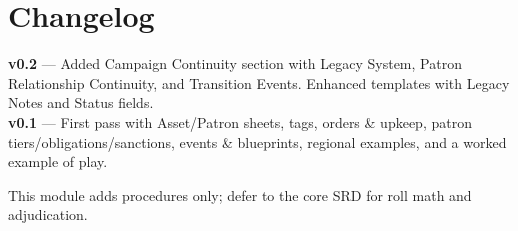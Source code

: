 \documentclass[11pt]{article}
\begin{document}
\vfill
\section*{Changelog}
\textbf{v0.2} --- Added Campaign Continuity section with Legacy System, Patron Relationship Continuity, and Transition Events. Enhanced templates with Legacy Notes and Status fields.\\
\textbf{v0.1} --- First pass with Asset/Patron sheets, tags, orders \& upkeep, patron tiers/obligations/sanctions, events \& blueprints, regional examples, and a worked example of play.

\begin{center}\small This module adds procedures only; defer to the core SRD for roll math and adjudication.\end{center}
\end{document}
